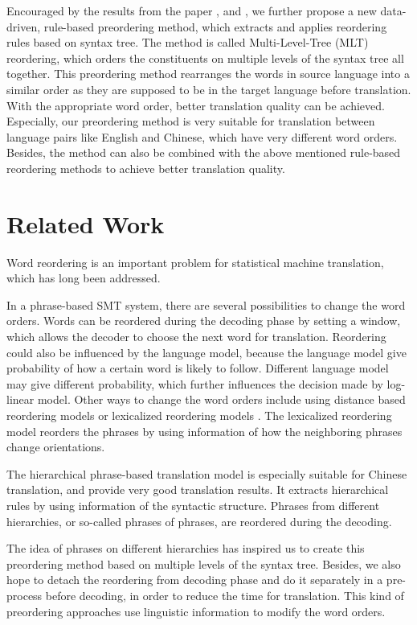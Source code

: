 \documentclass[a4paper]{article}
\begin{document}
Encouraged by the results from the paper \cite{short}, \cite{long} and \cite{tree}, we further propose a new data-driven, rule-based preordering method, which extracts and applies reordering rules based on syntax tree. The method is called Multi-Level-Tree (MLT) reordering, which orders the constituents on multiple levels of the syntax tree all together. This preordering method rearranges the words in source language into a similar order as they are supposed to be in the target language before translation. With the appropriate word order, better translation quality can be achieved. Especially, our preordering method is very suitable for translation between language pairs like English and Chinese, which have very different word orders. Besides, the method can also be combined with the above mentioned rule-based reordering methods to achieve better translation quality. 

\section{Related Work}

Word reordering is an important problem for statistical machine translation, which has long been addressed.

In a phrase-based SMT system, there are several possibilities to change the word orders. Words can be reordered during the decoding phase by setting a window, which allows the decoder to choose the next word for translation. Reordering could also be influenced by the language model, because the language model give probability of how a certain word is likely to follow. Different language model may give different probability, which further influences the decision made by log-linear model. Other ways to change the word orders include using distance based reordering models or lexicalized reordering models \cite{tillmann2004, koehn2005}. The lexicalized reordering model reorders the phrases by using information of how the neighboring phrases change orientations.

The hierarchical phrase-based translation model \cite{hier} is especially suitable for Chinese translation, and provide very good translation results. It extracts hierarchical rules by using information of the syntactic structure. Phrases from different hierarchies, or so-called phrases of phrases, are reordered during the decoding. 

The idea of phrases on different hierarchies has inspired us to create this preordering method based on multiple levels of the syntax tree. Besides, we also hope to detach the reordering from decoding phase and do it separately in a pre-process before decoding, in order to reduce the time for translation. This kind of preordering approaches use linguistic information to modify the word orders. 
\end{document}
